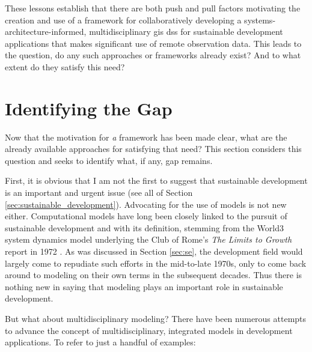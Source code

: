 \begin{itemize}[itemsep=0pt,parsep=0pt]
\end{itemize}

These lessons establish that there are both push and pull factors motivating the creation and use of a framework for collaboratively developing a systems-architecture-informed, multidisciplinary \ac{gis} \ac{dss} for sustainable development applications that makes significant use of remote observation data. This leads to the question, do any such approaches or frameworks already exist? And to what extent do they satisfy this need?

\section{Identifying the Gap} \label{sec:gap}

Now that the motivation for \textit{a} framework has been made clear, what are the already available approaches for satisfying that need? This section considers this question and seeks to identify what, if any, gap remains.

First, it is obvious that I am not the first to suggest that sustainable development is an important and urgent issue (see all of Section \ref{sec:sustainable_development}). Advocating for the use of models is not new either. Computational models have long been closely linked to the pursuit of sustainable development and with its definition, stemming from the World3 system dynamics model underlying the Club of Rome's \textit{The Limits to Growth} report in 1972 \cite{meadowsLimitsGrowth1972}. As was discussed in Section \ref{sec:se}, the development field would largely come to repudiate such efforts in the mid-to-late 1970s, only to come back around to modeling on their own terms in the subsequent decades. Thus there is nothing new in saying that modeling plays an important role in sustainable development.

But what about multidisciplinary modeling? There have been numerous attempts to advance the concept of multidisciplinary, integrated models in development applications. To refer to just a handful of examples:

